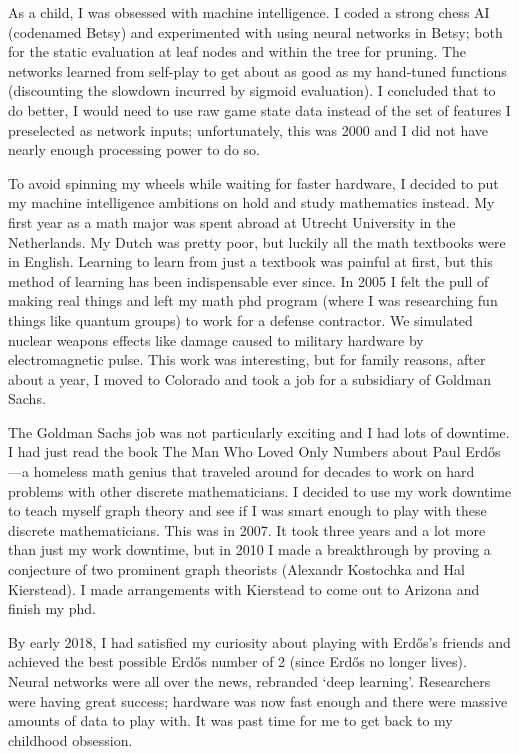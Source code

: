 \documentclass{article}
\title{}
\author{Landon Rabern}
\begin{document}
\maketitle

As a child, I was obsessed with machine intelligence. I coded a strong chess AI (codenamed Betsy) and experimented with using neural networks in Betsy;
both for the static evaluation at leaf nodes and within the tree for pruning. 
The networks learned from self-play to get about as good as my hand-tuned functions (discounting the slowdown incurred by sigmoid evaluation). 
I concluded that to do better, I would need to use raw game state data instead of the set of features I preselected as network inputs; 
unfortunately, this was 2000 and I did not have nearly enough processing power to do so. 

To avoid spinning my wheels while waiting for faster hardware, I decided to put my machine intelligence ambitions on hold and 
study mathematics instead. My first year as a math major was spent abroad at Utrecht University in the Netherlands. My Dutch was pretty poor, 
but luckily all the math textbooks were in English. 
Learning to learn from just a textbook was painful at first, but this method of learning has been indispensable ever since. 
In 2005 I felt the pull of making real things and left my math phd program (where I was researching fun things like quantum groups) to work for a defense contractor. 
We simulated nuclear weapons effects like damage caused to military hardware by electromagnetic pulse. 
This work was interesting, but for family reasons, after about a year, I moved to Colorado and took a job for a subsidiary of Goldman Sachs.

The Goldman Sachs job was not particularly exciting and I had lots of downtime. 
I had just read the book The Man Who Loved Only Numbers about Paul Erdős---a homeless math genius that traveled around for decades to work on hard 
problems with other discrete mathematicians. I decided to use my work downtime to teach myself graph theory and see if I was smart enough to play 
with these discrete mathematicians. 
This was in 2007. It took three years and a lot more than just my work downtime, but in 2010 I made a breakthrough by proving a conjecture of two prominent graph theorists (Alexandr Kostochka and Hal Kierstead). I made arrangements with Kierstead to come out to Arizona and finish my phd. 

By early 2018, I had satisfied my curiosity about playing with Erdős's friends and achieved the best possible Erdős number of 2 (since Erdős no longer lives). 
Neural networks were all over the news, rebranded `deep learning'. Researchers were having great success; hardware was now fast enough and there were massive amounts of data to play with. It was past time for me to get back to my childhood obsession.
\end{document}
